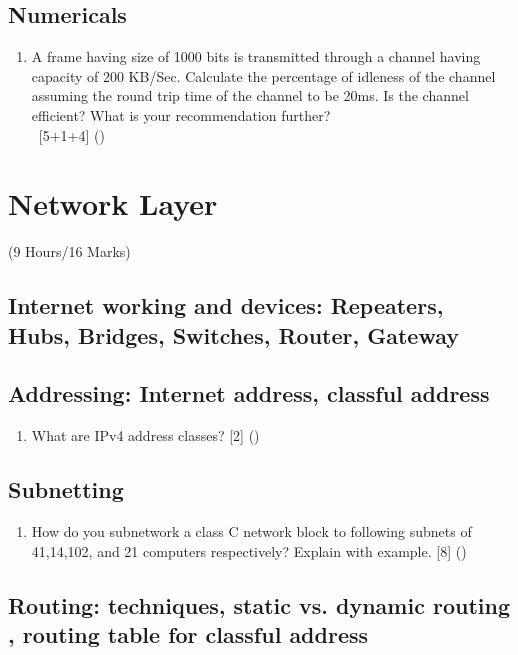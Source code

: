 \documentclass[12pt]{article}
\newcommand{\enter}{\\\textcolor{white}{1}}
\begin{document}
	\subsection{Numericals}
		\begin{enumerate}[noitemsep, topsep=0pt]
			\item A frame having size of 1000 bits is transmitted through a channel having capacity of 200 KB/Sec. Calculate the percentage of idleness of the channel assuming the round trip time of the channel to be 20ms. Is the channel efficient? What is your recommendation further?
			\enter\hfill [5+1+4] ()
		\end{enumerate}

	\pagebreak

\section{Network Layer}
	\begin{center}(9 Hours/16 Marks)\end{center}
	\subsection{Internet working and devices: Repeaters, Hubs, Bridges, Switches, Router, Gateway}
	\subsection{Addressing: Internet address, classful address}
		\begin{enumerate}[noitemsep, topsep=0pt]
			\item What are IPv4 address classes? \hfill [2] ()
		\end{enumerate}

	\subsection{Subnetting}
		\begin{enumerate}[noitemsep, topsep=0pt]
			\item How do you subnetwork a class C network block to following subnets of 41,14,102, and 21 computers respectively? Explain with example. \hfill [8] ()
		\end{enumerate}

	\subsection{Routing: techniques, static vs. dynamic routing , routing table for classful address}
\end{document}
